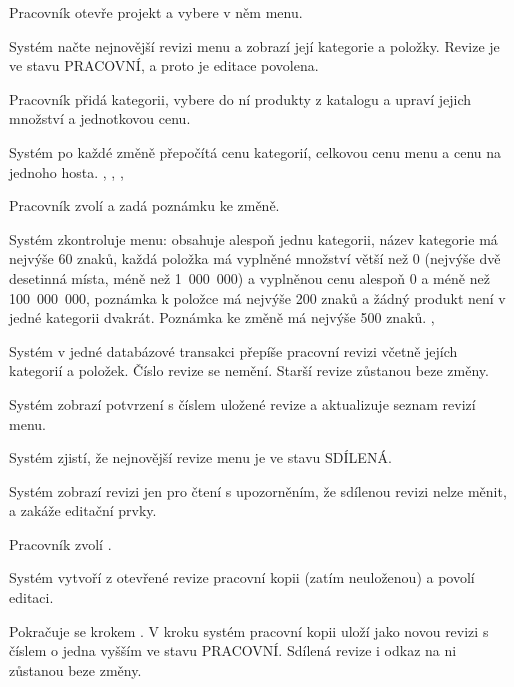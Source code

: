 \begin{ucsteps}
  \item \label{uc:08:1}Pracovník otevře projekt a vybere v něm menu.
  \item \label{uc:08:2}Systém načte nejnovější revizi menu a zobrazí její kategorie a položky. Revize je ve stavu PRACOVNÍ, a proto je editace povolena. 
  \item \label{uc:08:3}Pracovník přidá kategorii, vybere do ní produkty z katalogu a upraví jejich množství a jednotkovou cenu. 
  \item \label{uc:08:4}Systém po každé změně přepočítá cenu kategorií, celkovou cenu menu a cenu na jednoho hosta. , , , 
  \item \label{uc:08:5}Pracovník zvolí  a zadá poznámku ke změně.
  \item \label{uc:08:6}Systém zkontroluje menu: obsahuje alespoň jednu kategorii, název kategorie má nejvýše 60 znaků, každá položka má vyplněné množství větší než 0 (nejvýše dvě desetinná místa, méně než 1~000~000) a vyplněnou cenu alespoň 0 a méně než 100~000~000, poznámka k položce má nejvýše 200 znaků a žádný produkt není v jedné kategorii dvakrát. Poznámka ke změně má nejvýše 500 znaků. , 
  \item \label{uc:08:7}Systém v jedné databázové transakci přepíše pracovní revizi včetně jejích kategorií a položek. Číslo revize se nemění. Starší revize zůstanou beze změny.
  \item \label{uc:08:8}Systém zobrazí potvrzení s číslem uložené revize a aktualizuje seznam revizí menu.
\end{ucsteps}

\begin{ucalt}
  \item[2.1]\label{uc:08:2.1} Systém zjistí, že nejnovější revize menu je ve stavu SDÍLENÁ.
  \item[2.2]\label{uc:08:2.2} Systém zobrazí revizi jen pro čtení s upozorněním, že sdílenou revizi nelze měnit, a zakáže editační prvky.
  \item[2.3]\label{uc:08:2.3} Pracovník zvolí .
  \item[2.4]\label{uc:08:2.4} Systém vytvoří z otevřené revize pracovní kopii (zatím neuloženou) a povolí editaci. 
  \item[2.5]\label{uc:08:2.5} Pokračuje se krokem . V kroku  systém pracovní kopii uloží jako novou revizi s číslem o jedna vyšším ve stavu PRACOVNÍ. Sdílená revize i odkaz na ni zůstanou beze změny.
\end{ucalt}

